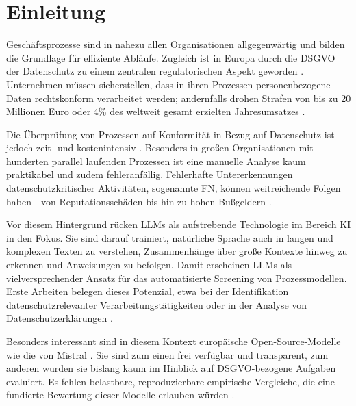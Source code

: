 \chapter{Einleitung}\label{ch:einleitung}

Geschäftsprozesse sind in nahezu allen Organisationen allgegenwärtig und bilden die Grundlage für effiziente Abläufe. Zugleich ist in Europa durch die \ac{DSGVO} der Datenschutz zu einem zentralen regulatorischen Aspekt geworden \cite{Capodieci2023BPMNEnabledDP, GDPR2016}. Unternehmen müssen sicherstellen, dass in ihren Prozessen personenbezogene Daten rechtskonform verarbeitet werden; andernfalls drohen Strafen von bis zu 20 Millionen Euro oder 4\% des weltweit gesamt erzielten Jahresumsatzes \cite{GDPR2016}.


Die Überprüfung von Prozessen auf Konformität in Bezug auf Datenschutz ist jedoch zeit- und kostenintensiv \cite{nake2023towards, varela2025business}. Besonders in großen Organisationen mit hunderten parallel laufenden Prozessen ist eine manuelle Analyse kaum praktikabel und zudem fehleranfällig. Fehlerhafte Untererkennungen datenschutzkritischer Aktivitäten, sogenannte \ac{FN}, können weitreichende Folgen haben - von Reputationsschäden bis hin zu hohen Bußgeldern \cite{nake2023towards}.


Vor diesem Hintergrund rücken \acp{LLM} als aufstrebende Technologie im Bereich \ac{KI} in den Fokus. Sie sind darauf trainiert, natürliche Sprache auch in langen und komplexen Texten zu verstehen, Zusammenhänge über große Kontexte hinweg zu erkennen und Anweisungen zu befolgen. Damit erscheinen \acp{LLM} als vielversprechender Ansatz für das automatisierte Screening von Prozessmodellen. Erste Arbeiten belegen dieses Potenzial, etwa bei der Identifikation datenschutzrelevanter Verarbeitungstätigkeiten oder in der Analyse von Datenschutzerklärungen \cite{ciaramella2022leveraging, pragyan2024toward}.


Besonders interessant sind in diesem Kontext europäische Open-Source-Modelle wie die von Mistral \cite{mistralai}. Sie sind zum einen frei verfügbar und transparent, zum anderen wurden sie bislang kaum im Hinblick auf \ac{DSGVO}-bezogene Aufgaben evaluiert. Es fehlen belastbare, reproduzierbare empirische Vergleiche, die eine fundierte Bewertung dieser Modelle erlauben würden \cite{schwerin2024systematic}.



